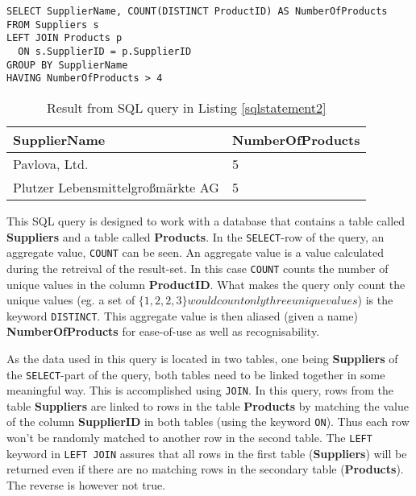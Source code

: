 \begin{lstlisting}[caption={SQL Query to retreive all suppliers carrying more
      than four products.},label={sqlstatement2}]
SELECT SupplierName, COUNT(DISTINCT ProductID) AS NumberOfProducts
FROM Suppliers s
LEFT JOIN Products p
  ON s.SupplierID = p.SupplierID
GROUP BY SupplierName
HAVING NumberOfProducts > 4
\end{lstlisting}

\begin{table}[h]
  \centering
  \begin{tabular}{ | l | l | }
    \hline
    \textbf{SupplierName} & \textbf{NumberOfProducts} \\
    \hline
    Pavlova, Ltd. & 5  \\
    \hline
    Plutzer Lebensmittelgro{\ss}märkte AG & 5 \\
    \hline
  \end{tabular}
  \caption{Result from SQL query in Listing \ref{sqlstatement2}}
  \label{table:sql2}
\end{table}


This SQL query is designed to work with a database that contains a table
called \textbf{Suppliers} and a table called \textbf{Products}. In the
\texttt{SELECT}-row of the query, an aggregate value, \texttt{COUNT} can be
seen. An aggregate value is a value calculated during the retreival of the
result-set. In this case \texttt{COUNT} counts the number of unique
values in the column \textbf{ProductID}. What makes the query only count
the unique values (eg. a set of $\{1,2,2,3\} would count only three unique
values$) is the keyword \texttt{DISTINCT}. This aggregate value is then
aliased (given a name) \textbf{NumberOfProducts} for ease-of-use as well
as recognisability.

As the data used in this query is located in two tables, one being
\textbf{Suppliers} of the \texttt{SELECT}-part of the query, both
tables need to be linked together in some meaningful way. This is
accomplished using \texttt{JOIN}. In this query, rows from the table
\textbf{Suppliers} are linked to rows in the table \textbf{Products}
by matching the value of the column \textbf{SupplierID} in both
tables (using the keyword \texttt{ON}). Thus each row won't be
randomly matched to another row in the second table. The \texttt{LEFT}
keyword in \texttt{LEFT JOIN} assures that all rows in the first table
(\textbf{Suppliers}) will be returned even if there are no matching
rows in the secondary table (\textbf{Products}). The reverse is however
not true.

